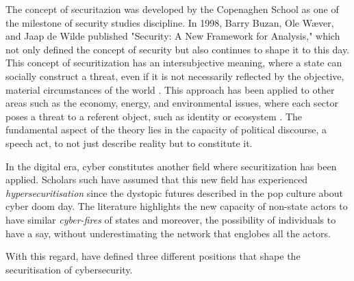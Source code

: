 The concept of securitazion was developed by the Copenaghen School as one of the milestone of security studies discipline. In 1998, Barry Buzan, Ole Wæver, and Jaap de Wilde published "Security: A New Framework for Analysis," which not only defined the concept of security but also continues to shape it to this day. This concept of securitization has an intersubjective meaning, where a state can socially construct a threat, even if it is not necessarily reflected by the objective, material circumstances of the world \autocite{balzacq_2016_securitization}. This approach has been applied to other areas such as the economy, energy, and environmental issues, where each sector poses a threat to a referent object, such as identity or ecosystem \autocite{eroukhmanoff_2018_securitisation}. The fundamental aspect of the theory lies in the capacity of political discourse, a speech act, to not just describe reality but to constitute it. 

In the digital era, cyber constitutes another field where securitization has been applied.  Scholars such \textcite{hansen_2009_digital} have assumed that this new field has experienced \textit{hypersecuritisation} since the dystopic futures described in the pop culture about cyber doom day. The literature highlights the new capacity of non-state actors to have similar \textit{cyber-fires} of states and moreover, the possibility of individuals to have a say, without underestimating the network that englobes all the actors. 

With this regard, \textcite{lacy_2018_securitization} have defined three different positions that shape the securitisation of cybersecurity.

